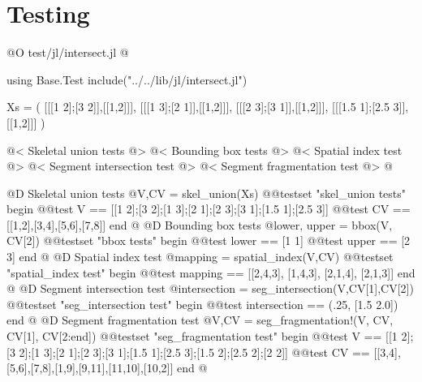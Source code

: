 \documentclass[10pt,oneside]{article}
\begin{document}
\section{Testing}
@O test/jl/intersect.jl
@{using Base.Test
include("../../lib/jl/intersect.jl")

Xs = (
    [[[1 2];[3 2]],[[1,2]]],
    [[[1 3];[2 1]],[[1,2]]],
    [[[2 3];[3 1]],[[1,2]]],
    [[[1.5 1];[2.5 3]],[[1,2]]]
)

@< Skeletal union tests @>
@< Bounding box tests @>
@< Spatial index test @>
@< Segment intersection test @>
@< Segment fragmentation test @>
@}
@D Skeletal union tests
@{V,CV = skel_union(Xs)
@@testset "skel_union tests" begin
    @@test V == [[1 2];[3 2];[1 3];[2 1];[2 3];[3 1];[1.5 1];[2.5 3]]
    @@test CV == [[1,2],[3,4],[5,6],[7,8]]
end
@}
@D Bounding box tests
@{lower, upper = bbox(V, CV[2])
@@testset "bbox tests" begin
    @@test lower == [1 1]
    @@test upper == [2 3]
end
@}
@D Spatial index test
@{mapping = spatial_index(V,CV)
@@testset "spatial_index test" begin
    @@test mapping == [[2,4,3], [1,4,3], [2,1,4], [2,1,3]]
end
@}
@D Segment intersection test
@{intersection = seg_intersection(V,CV[1],CV[2])
@@testset "seg_intersection test" begin
    @@test intersection == (.25, [1.5 2.0])
end
@}
@D Segment fragmentation test
@{V,CV = seg_fragmentation!(V, CV, CV[1], CV[2:end])
@@testset "seg_fragmentation test" begin
    @@test V == [[1 2];[3 2];[1 3];[2 1];[2 3];[3 1];[1.5 1];[2.5 3];[1.5 2];[2.5 2];[2 2]]
    @@test CV == [[3,4],[5,6],[7,8],[1,9],[9,11],[11,10],[10,2]]
end
@}
\end{document}

